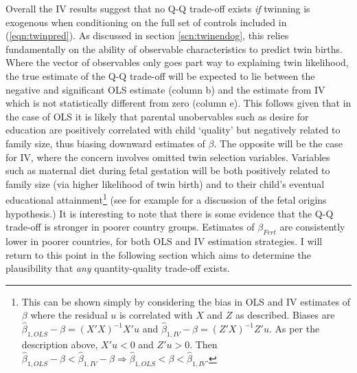 \documentclass{article}[11pt,subeqn]
\begin{document}
\begin{spacing}{1.5}
Overall the IV results suggest that no Q-Q trade-off exists \emph{if} twinning is exogenous when conditioning on the full set of controls included in (\ref{eqn:twinpred}).  
As discussed in section \ref{scn:twinendog}, this relies fundamentally on the ability of observable characteristics to predict twin births.  Where the vector of observables 
only goes part way to explaining twin likelihood, the true estimate of the Q-Q trade-off will be expected to lie between the negative and significant OLS estimate (column b) 
and the estimate from IV which is not statistically different from zero (column e).  This follows given that in the case of OLS it is likely that parental unobervables such as 
desire for education are positively correlated with child `quality' but negatively related to family size, thus biasing downward estimates of $\beta$.  The opposite 
will be the case for IV, where the concern involves omitted twin selection variables.  Variables such as maternal diet during fetal gestation will be both positively related to 
family size (via higher likelihood of twin birth) and to their child's eventual educational attainment\footnote{This can be shown simply by considering the bias in OLS and IV
estimates of $\beta$ where the residual $u$ is correlated with $X$ and $Z$ as described.  Biases are $\hat{\beta}_{1,OLS}-\beta=(X'X)^{-1}X'u$ and $\hat{\beta}_{1,IV}-\beta=(Z'X)^{-1}Z'u$.
As per the description above, $X'u<0$ and $Z'u>0$.  Then $\hat{\beta}_{1,OLS}-\beta<\hat{\beta}_{1,IV}-\beta\Rightarrow\hat{\beta}_{1,OLS}<\beta<\hat{\beta}_{1,IV}$.}
 (see for example \citet{Barker1995} for a discussion of the fetal origins 
hypothesis.)  It is interesting to note that there is some evidence that the Q-Q trade-off is stronger in poorer country groups.  Estimates of $\beta_{Fert}$ are 
consistently lower in poorer countries, for both OLS and IV estimation strategies.  I will return to this point in the following section which aims to determine the plausibility 
that \emph{any} quantity-quality trade-off exists.






\end{spacing}
\end{document}
